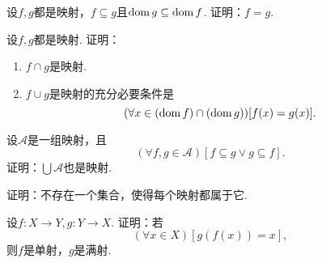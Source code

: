 \begin{example}
设\(f,g\)都是映射，\(f \subseteq g\)且\(\operatorname{dom} g \subseteq \operatorname{dom} f\).
证明：\(f=g\).
\end{example}

\begin{example}
设\(f,g\)都是映射.
证明：
\begin{enumerate}
	\item \(f \cap g\)是映射.
	\item \(f \cup g\)是映射的充分必要条件是\[
		(\forall x \in (\operatorname{dom} f)\cap(\operatorname{dom} g))[f(x)=g(x)].
	\]
\end{enumerate}
\end{example}

\begin{example}
\def\A{\mathscr{A}}%
设\(\A\)是一组映射，且\[
	(\forall f,g\in\A)[f \subseteq g \lor g \subseteq f].
\]
证明：\(\bigcup\A\)也是映射.
\end{example}

\begin{example}
证明：不存在一个集合，使得每个映射都属于它.
\end{example}

\begin{example}
设\(f\colon X \to Y,
g\colon Y \to X\).
证明：若\[
	(\forall x \in X)[g(f(x)) = x],
\]
则\(f\)是单射，\(g\)是满射.
\end{example}


